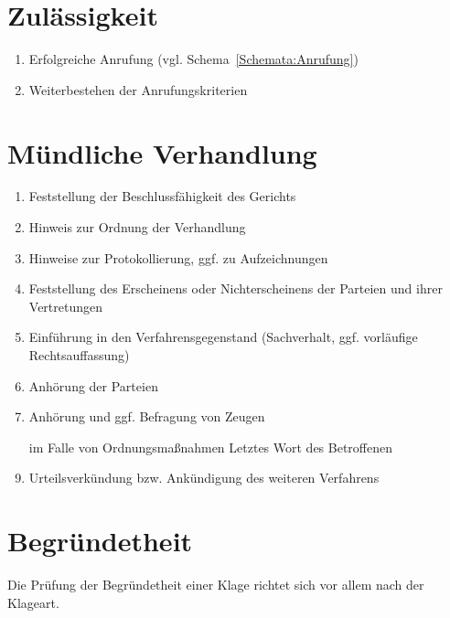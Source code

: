 \section{Zulässigkeit}
\begin{enumerate}
\item Erfolgreiche Anrufung (vgl. Schema~\ref{Schemata:Anrufung})
\item Weiterbestehen der Anrufungskriterien
\end{enumerate}

\section{Mündliche Verhandlung}
\begin{enumerate}
\item Feststellung der Beschlussfähigkeit des Gerichts
\item Hinweis zur Ordnung der Verhandlung
\item Hinweise zur Protokollierung, ggf. zu Aufzeichnungen
\item Feststellung des Erscheinens oder Nichterscheinens der Parteien und ihrer Vertretungen
\item Einführung in den Verfahrensgegenstand (Sachverhalt, ggf. vorläufige Rechtsauffassung)
\item Anhörung der Parteien
\item Anhörung und ggf. Befragung von Zeugen
\item [im Falle von Ordnungsmaßnahmen] Letztes Wort des Betroffenen
\item Urteilsverkündung bzw. Ankündigung des weiteren Verfahrens
\end{enumerate}

\section{Begründetheit}
Die Prüfung der Begründetheit einer Klage richtet sich vor allem nach der Klageart.
